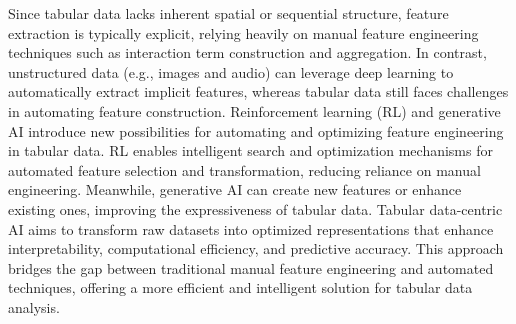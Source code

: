 Since tabular data lacks inherent spatial or sequential structure, feature extraction is typically explicit, relying heavily on manual feature engineering techniques such as interaction term construction and aggregation. In contrast, unstructured data (e.g., images and audio) can leverage deep learning to automatically extract implicit features, whereas tabular data still faces challenges in automating feature construction.
Reinforcement learning (RL) and generative AI introduce new possibilities for automating and optimizing feature engineering in tabular data. RL enables intelligent search and optimization mechanisms for automated feature selection and transformation, reducing reliance on manual engineering. Meanwhile, generative AI can create new features or enhance existing ones, improving the expressiveness of tabular data.
Tabular data-centric AI aims to transform raw datasets into optimized representations that enhance interpretability, computational efficiency, and predictive accuracy. This approach bridges the gap between traditional manual feature engineering and automated techniques, offering a more efficient and intelligent solution for tabular data analysis.


